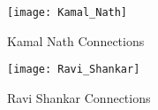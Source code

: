 \begin{figure}[here]
\begin{center}	
\texttt{[image: Kamal\_Nath]} 
\caption{Kamal Nath Connections}
\label{fig:kamalnath}
\end{center}
\end{figure}

\begin{figure}[here]
\begin{center}	
\texttt{[image: Ravi\_Shankar]} 
\caption{Ravi Shankar Connections}
\label{fig:ravishankar}
\end{center}
\end{figure}

